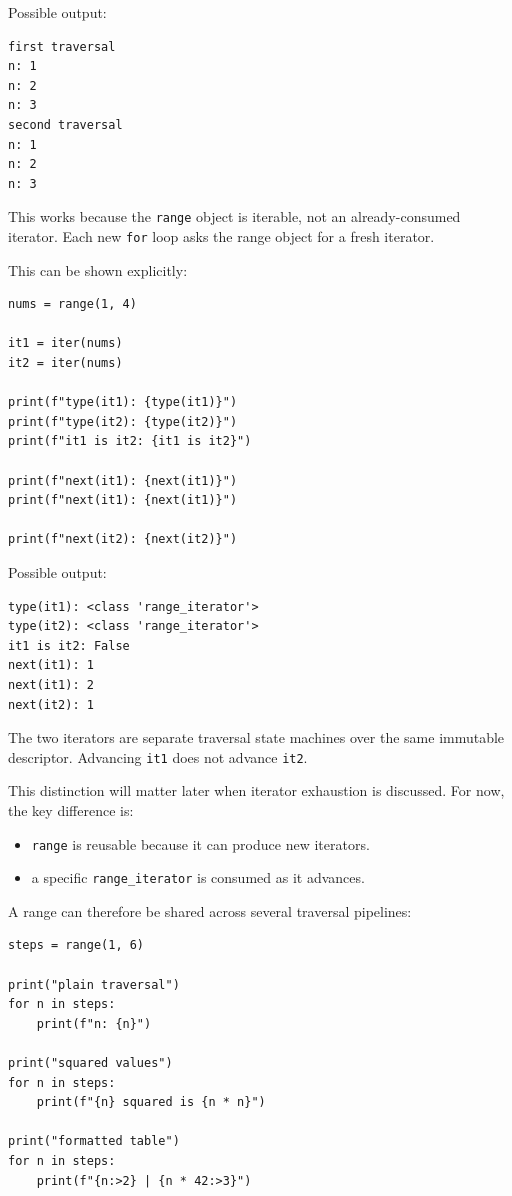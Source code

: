 \documentclass[a4paper,twoside]{report}
\begin{document}
Possible output:

\begin{verbatim}
first traversal
n: 1
n: 2
n: 3
second traversal
n: 1
n: 2
n: 3
\end{verbatim}

This works because the \texttt{range} object is iterable, not an already-consumed iterator. Each new \texttt{for} loop asks the range object for a fresh iterator.

This can be shown explicitly:

\begin{verbatim}
nums = range(1, 4)

it1 = iter(nums)
it2 = iter(nums)

print(f"type(it1): {type(it1)}")
print(f"type(it2): {type(it2)}")
print(f"it1 is it2: {it1 is it2}")

print(f"next(it1): {next(it1)}")
print(f"next(it1): {next(it1)}")

print(f"next(it2): {next(it2)}")
\end{verbatim}

Possible output:

\begin{verbatim}
type(it1): <class 'range_iterator'>
type(it2): <class 'range_iterator'>
it1 is it2: False
next(it1): 1
next(it1): 2
next(it2): 1
\end{verbatim}

The two iterators are separate traversal state machines over the same immutable descriptor. Advancing \texttt{it1} does not advance \texttt{it2}.

This distinction will matter later when iterator exhaustion is discussed. For now, the key difference is:

\begin{itemize}
    \item \texttt{range} is reusable because it can produce new iterators.
    \item a specific \texttt{range\_iterator} is consumed as it advances.
\end{itemize}

A range can therefore be shared across several traversal pipelines:

\begin{verbatim}
steps = range(1, 6)

print("plain traversal")
for n in steps:
    print(f"n: {n}")

print("squared values")
for n in steps:
    print(f"{n} squared is {n * n}")

print("formatted table")
for n in steps:
    print(f"{n:>2} | {n * 42:>3}")
\end{verbatim}
\end{document}
